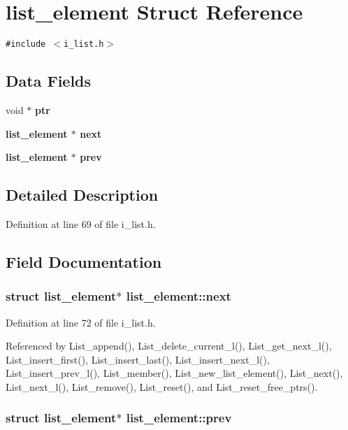 \section{list\_\-element Struct Reference}
\label{structlist__element}
{\tt \#include $<$i\_\-list.h$>$}

\subsection*{Data Fields}
\begin{CompactItemize}
\item 
void $\ast$ \bf{ptr}
\item 
\bf{list\_\-element} $\ast$ \bf{next}
\item 
\bf{list\_\-element} $\ast$ \bf{prev}
\end{CompactItemize}


\subsection{Detailed Description}




Definition at line 69 of file i\_\-list.h.

\subsection{Field Documentation}
\subsubsection{\setlength{\rightskip}{0pt plus 5cm}struct \bf{list\_\-element}$\ast$ \bf{list\_\-element::next}}\label{structlist__element_66e1becb179745b2a4070941b9a4052d}




Definition at line 72 of file i\_\-list.h.

Referenced by List\_\-append(), List\_\-delete\_\-current\_\-l(), List\_\-get\_\-next\_\-l(), List\_\-insert\_\-first(), List\_\-insert\_\-last(), List\_\-insert\_\-next\_\-l(), List\_\-insert\_\-prev\_\-l(), List\_\-member(), List\_\-new\_\-list\_\-element(), List\_\-next(), List\_\-next\_\-l(), List\_\-remove(), List\_\-reset(), and List\_\-reset\_\-free\_\-ptrs().
\subsubsection{\setlength{\rightskip}{0pt plus 5cm}struct \bf{list\_\-element}$\ast$ \bf{list\_\-element::prev}}\label{structlist__element_f8bc8c47d995dc315b7232f959aa6160}




